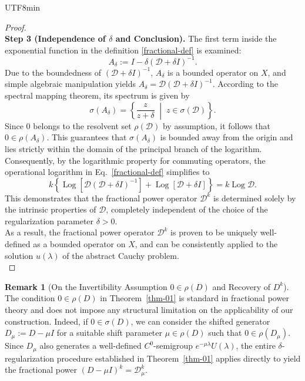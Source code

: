 \documentclass[10pt,a4paper]{article}
\theoremstyle{definition}
\newtheorem{remark}[theorem]{Remark}
\theoremstyle{remark}
\begin{document}
\begin{CJK}{UTF8}{min}
\begin{proof}
\vspace{2mm}\\
\noindent\textbf{Step 3 (Independence of $\delta$ and Conclusion).} 
The first term inside the exponential function in the definition \eqref{fractional-def} is examined:
\[ A_\delta := I - \delta (\mathcal{D} + \delta I)^{-1}.\]
Due to the boundedness of $(\mathcal{D} + \delta I)^{-1}$, $A_\delta$ is a bounded operator on $X$, and simple algebraic manipulation yields $A_\delta = \mathcal{D}(\mathcal{D} + \delta I)^{-1}$. 
According to the spectral mapping theorem, its spectrum is given by
\[
\sigma(A_\delta) = \left\{ \frac{z}{z + \delta} \;\middle|\; z \in \sigma(\mathcal{D}) \right\}.
\]
Since $0$ belongs to the resolvent set $\rho(\mathcal{D})$ by assumption, it follows that $0 \in \rho(A_\delta)$. 
This guarantees that $\sigma(A_\delta)$ is bounded away from the origin and lies strictly within the domain of the principal branch of the logarithm. 
Consequently, by the logarithmic property for commuting operators, the operational logarithm in Eq.~\eqref{fractional-def} simplifies to
\[ 
k \left\{ \operatorname{Log} \left[ \mathcal{D}(\mathcal{D} + \delta I)^{-1} \right] + \operatorname{Log} [\mathcal{D} + \delta I] \right\} = k \operatorname{Log} \mathcal{D}. 
\]
This demonstrates that the fractional power operator $\mathcal{D}^k$ is determined solely by the intrinsic properties of $\mathcal{D}$, completely independent of the choice of the regularization parameter $\delta > 0$. \vspace{2mm} \\
As a result, the fractional power operator $\mathcal{D}^k$ is proven to be uniquely well-defined as a bounded operator on $X$, and can be consistently applied to the solution $u(\lambda)$ of the abstract Cauchy problem.\vspace{2mm}\\
\end{proof}

\begin{remark}[On the Invertibility Assumption $0 \in \rho(D)$ and Recovery of $D^k$] \label{rem-resolvent}
The condition $0 \in \rho(D)$ in Theorem~\ref{thm-01} is standard in fractional power theory and does not impose any structural limitation on the applicability of our construction. 
Indeed, if $0 \in \sigma(D)$, we can consider the shifted generator $D_\mu := D - \mu I$ for a suitable shift parameter $\mu \in \rho(D)$ such that $0 \in \rho(D_\mu)$. 
Since $D_\mu$ also generates a well-defined $C^0$-semigroup $e^{-\mu \lambda} U(\lambda)$, the entire $\delta$-regularization procedure established in Theorem~\ref{thm-01} applies directly to yield the fractional power $(D-\mu I)^k = \mathcal{D}_\mu^k$.


\end{remark}
\end{CJK}
\end{document}
